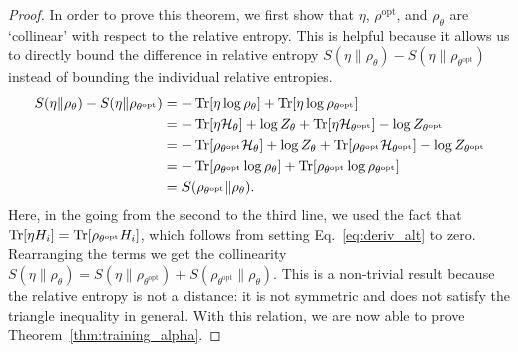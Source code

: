 \documentclass[
    aps,
    prx,
    onecolumn
]{revtex4-2}
\begin{document}
\begin{proof}
In order to prove this theorem, we first show that $\eta$, $\rho^\mathrm{opt}$, and $\rho_\theta$ are `collinear' with respect to the relative entropy. This is helpful because it allows us to directly bound the difference in relative entropy $ S(\eta \| \rho_{\theta}) - S(\eta \| \rho_{\theta^\mathrm{opt}})$ instead of bounding the individual relative entropies.
\begin{align}
\begin{split}
\label{eq:collinear}
    S(\eta \| \rho_{\theta}) - S(\eta \| \rho_{\theta^\mathrm{opt}})&= -\Tr[\eta \log \rho_\theta ] + \Tr[ \eta \log \rho_{\theta^\mathrm{opt}}] \\
    &= -\Tr[\eta \mathcal{H}_\theta] + \log Z_\theta + \Tr[\eta \mathcal{H}_{\theta^\mathrm{opt}}] - \log Z_{\theta^\mathrm{opt}} \\
    &= -\Tr[\rho_{\theta^\mathrm{opt}} \mathcal{H}_\theta] + \log Z_\theta + \Tr[\rho_{\theta^\mathrm{opt}} \mathcal{H}_{\theta^\mathrm{opt}}] - \log Z_{\theta^\mathrm{opt}} \\
    &= -\Tr[\rho_{\theta^\mathrm{opt}} \log \rho_{\theta} ] + \Tr[\rho_{\theta^\mathrm{opt}} \log \rho_{\theta^\mathrm{opt}} ]  \\
    &= S(\rho_{\theta^\mathrm{opt}} \| \rho_{\theta}) .
\end{split}
\end{align}
Here, in the going from the second to the third line, we used the fact that $\Tr[\eta H_i] = \Tr[\rho_{\theta^{\mathrm{opt}}} H_i]$, which follows from setting Eq.~\eqref{eq:deriv_alt} to zero. Rearranging the terms we get the collinearity $S(\eta \| \rho_{\theta}) = S(\eta \| \rho_{\theta^\mathrm{opt}}) + S(\rho_{\theta^\mathrm{opt}} \| \rho_{\theta})$.  
This is a non-trivial result because the relative entropy is not a distance: it is not symmetric and does not satisfy the triangle inequality in general. With this relation, we are now able to prove Theorem~\ref{thm:training_alpha}. 


\end{proof}
\end{document}
